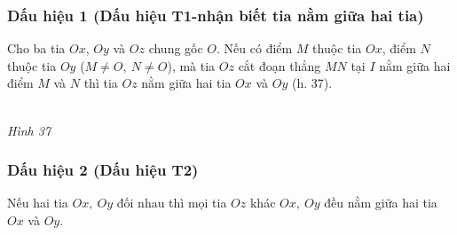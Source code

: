 \subsubsection{Dấu hiệu 1 (Dấu hiệu T1-nhận biết tia nằm giữa hai tia)}
Cho ba tia $Ox$, $Oy$ và $Oz$ chung gốc $O$. Nếu có điểm $M$ thuộc tia $Ox$, điểm $N$ thuộc tia $Oy$ ($M\neq O,\ N\neq O$), mà tia $Oz$ cắt đoạn thẳng $MN$ tại $I$ nằm giữa hai điểm $M$ và $N$ thì tia $Oz$ nằm giữa hai tia $Ox$ và $Oy$ (h. 37). 
\begin{center}
	\\
	\centering \textit{Hình 37}
\end{center}
\subsubsection{Dấu hiệu 2 (Dấu hiệu T2)}
 Nếu hai tia $Ox,\ Oy$ đối nhau thì mọi tia $Oz$ khác $Ox,\ Oy$ đều nằm giữa hai tia $Ox$ và $Oy$.

